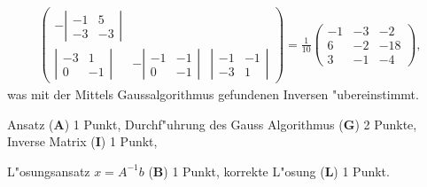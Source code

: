 \begin{loesung}
\begin{align*}
\begin{pmatrix}
-\left|\begin{matrix}-1& 5\\-3&-3\end{matrix}\right|\\
\left|\begin{matrix}-3& 1\\ 0&-1\end{matrix}\right|&
-\left|\begin{matrix}-1&-1\\ 0&-1\end{matrix}\right|&
\left|\begin{matrix}-1&-1\\-3& 1\end{matrix}\right|
\end{pmatrix}
=
\frac1{10}
\begin{pmatrix}
-1&-3& -2\\
 6&-2&-18\\
 3&-1& -4
\end{pmatrix},
\end{align*}
was mit der Mittels Gaussalgorithmus gefundenen Inversen "ubereinstimmt.
\end{loesung}

\begin{bewertung}
\begin{teilaufgaben}
\item
Ansatz (\textbf{A}) 1 Punkt,
Durchf"uhrung des Gauss Algorithmus (\textbf{G}) 2 Punkte,
Inverse Matrix (\textbf{I}) 1 Punkt,
\item
L"osungsansatz $x=A^{-1}b$ (\textbf{B}) 1 Punkt,
korrekte L"osung (\textbf{L}) 1 Punkt.
\end{teilaufgaben}
\end{bewertung}

